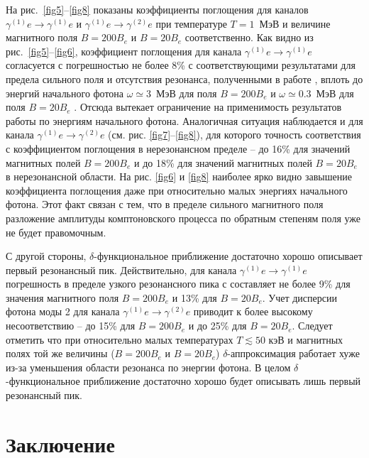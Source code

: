 \documentclass[cp1251%
               ]{jetp} %
\begin{document}
На рис.~\ref{fig5}--\ref{fig8} показаны коэффициенты поглощения для каналов $\gamma^{(1)}e\to\gamma^{(1)}e$ и $\gamma^{(1)}e\to\gamma^{(2)}e$ при температуре $T=1 $~МэВ и величине магнитного поля $B=200B_e$ и $B=20B_e$ соответственно. Как видно из рис.~\ref{fig5}--\ref{fig6}, коэффициент поглощения для канала $\gamma^{(1)}e\to\gamma^{(1)}e$ согласуется с погрешностью не более 8\% с соответствующими результатами для предела сильного поля и отсутствия резонанса, полученными в работе \cite{Chistyakov:2009}, вплоть до энергий начального фотона  $\omega\simeq3$~МэВ для поля $B=200B_e$ и  $\omega\simeq0.3$~МэВ для поля $B=20B_e$ . Отсюда вытекает ограничение на применимость результатов работы \cite{Chistyakov:2009} по энергиям начального фотона. Аналогичная ситуация наблюдается и для канала $\gamma^{(1)}e\to\gamma^{(2)}e$ (см. рис. \ref{fig7}--\ref{fig8}), для которого точность соответствия с коэффициентом поглощения в нерезонансном пределе -- до 16\% для значений магнитных полей $B=200B_e$ и до 18\% для значений магнитных полей $B=20B_e$ в нерезонансной области.  На рис. \ref{fig6} и \ref{fig8} наиболее ярко видно завышение коэффициента поглощения даже при относительно малых энергиях начального фотона. Этот факт связан с тем, что в пределе сильного магнитного поля разложение амплитуды комптоновского процесса по обратным степеням поля уже не будет правомочным.

С  другой стороны, $\delta$-функциональное приближение достаточно хорошо описывает первый резонансный пик. Действительно, для канала $\gamma^{(1)}e\to\gamma^{(1)}e$ погрешность в пределе узкого резонансного пика с составляет не более 9\% для значения магнитного поля $B=200B_e$ и 13\% для $B=20 B_e$. Учет дисперсии фотона моды 2 для канала $\gamma^{(1)}e\to\gamma^{(2)}e$ приводит к более высокому несоответствию -- до 15\% для $B=200B_e$ и до 25\% для $B=20B_e$.
Следует отметить   что при относительно малых температурах $T\lesssim50$ кэВ и магнитных полях той же величины ($B = 200 B_e$ и $B = 20 B_e$) $\delta$-аппроксимация работает хуже из-за уменьшения области резонанса по энергии фотона. В целом $\delta$-функциональное приближение достаточно хорошо будет описывать лишь первый резонансный пик.




\section{Заключение}
\end{document}
